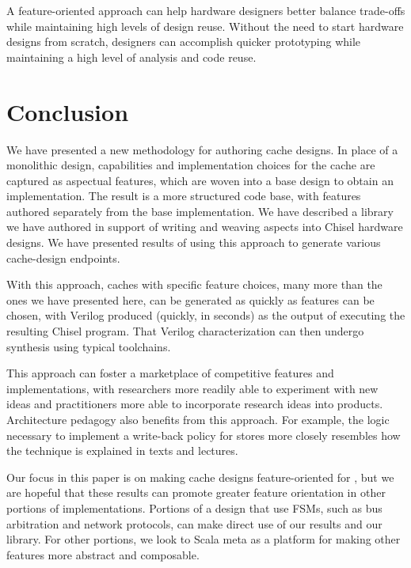 \documentclass[conference]{IEEEtran}
\begin{document}
A feature-oriented approach can help hardware designers better balance trade-offs while maintaining high levels of design reuse. Without the need to start hardware designs from scratch, designers can accomplish quicker prototyping while maintaining a high level of analysis and code reuse.

\section{Conclusion}
We have presented a new methodology for authoring cache designs.  In place of a monolithic design, capabilities and implementation choices for the cache are captured as aspectual features, which are woven into a base design to obtain an implementation.   The result is a more structured code base, with features authored separately from the base implementation.  We have described a library we have authored in support of writing and weaving aspects into Chisel hardware designs.  We have presented results of using this approach to generate various cache-design endpoints.

With this approach, caches with specific feature choices, many more than the ones we have presented here, can be generated as quickly as features can be chosen, with Verilog produced (quickly, in seconds) as the output of executing the resulting Chisel program.  That Verilog characterization can then undergo synthesis using typical toolchains.

This approach can foster a marketplace of competitive features and implementations, with researchers more readily able to experiment with new ideas and practitioners more able to incorporate research ideas into products.  Architecture pedagogy also benefits from this approach.  For example, the logic necessary to implement a write-back policy for stores more closely resembles how the technique is explained in texts and lectures.

Our focus in this paper is on making cache designs feature-oriented for \Riscv{}, but we are hopeful that these results can promote greater feature orientation in other portions of \Riscv{} implementations.  Portions of a design that use FSMs, such as bus arbitration and network protocols, can make direct use of our results and our library.  For other portions, we look to Scala meta as a platform for making other \Riscv{} features more abstract and composable.







\end{document}
